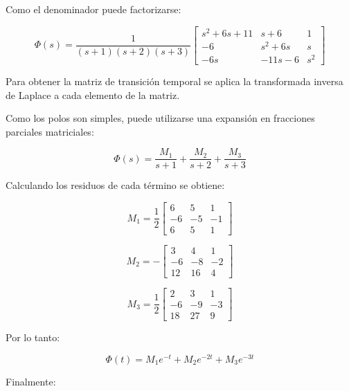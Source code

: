 \documentclass[12pt,a4paper]{article}
\begin{document}
Como el denominador puede factorizarse:

\begin{equation}\boxed{\Phi(s)=\frac{1}{(s+1)(s+2)(s+3)} \begin{bmatrix}s^2+6s+11&s+6&1\\-6&s^2+6s&s\\-6s&-11s-6&s^2\end{bmatrix}}\end{equation}

Para obtener la matriz de transición temporal se aplica la transformada inversa de Laplace a cada elemento de la matriz.

Como los polos son simples, puede utilizarse una expansión en fracciones parciales matriciales:

\begin{equation}\Phi(s)=\frac{M_1}{s+1}+\frac{M_2}{s+2}+\frac{M_3}{s+3}\end{equation}

Calculando los residuos de cada término se obtiene:

\begin{equation}M_1=\frac{1}{2} \begin{bmatrix}6&5&1\\-6&-5&-1\\6&5&1\end{bmatrix}\end{equation}

\begin{equation}M_2=-\begin{bmatrix}3&4&1\\-6&-8&-2\\12&16&4\end{bmatrix}\end{equation}

\begin{equation}M_3=\frac{1}{2} \begin{bmatrix}2&3&1\\-6&-9&-3\\18&27&9\end{bmatrix}\end{equation}

Por lo tanto:

\begin{equation}\Phi(t)=M_1e^{-t}+M_2e^{-2t}+M_3e^{-3t}\end{equation}

Finalmente:
\end{document}
